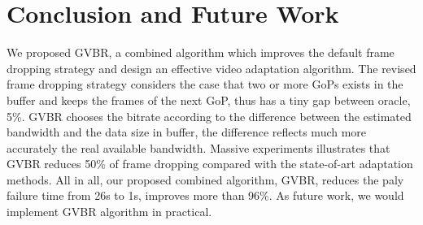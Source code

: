 \section{Conclusion and Future Work}
We proposed GVBR, a combined algorithm which improves the default frame dropping strategy and design an effective video adaptation algorithm. The revised frame dropping strategy considers the case that two or more GoPs exists in the buffer and keeps the frames of the next GoP, thus has a tiny gap between oracle, 5\%. GVBR chooses the bitrate according to the difference between the estimated bandwidth and the data size in buffer, the difference reflects much more accurately the real available bandwidth. Massive experiments illustrates that GVBR reduces 50\% of frame dropping compared with the state-of-art adaptation methods. All in all, our proposed combined algorithm, GVBR, reduces the paly failure time from 26s to 1s, improves more than 96\%.
As future work, we would implement GVBR algorithm in practical.